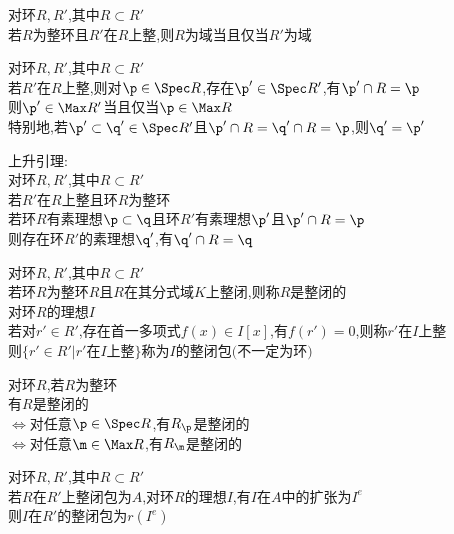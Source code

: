 \begin{dingli}
对环$R,R'$,其中$R\subset R'$\\
若$R$为整环且$R'$在$R$上整,则$R$为域当且仅当$R'$为域
\end{dingli}

\begin{dingli}
对环$R,R'$,其中$R\subset R'$\\
若$R'$在$R$上整,则对$\p\in \Spec R$,存在$\p'\in \Spec R'$,有$\p'\cap R=\p$\\
则$\p'\in\Max R'$当且仅当$\p\in \Max R$\\
特别地,若$\p'\subset\q'\in\Spec R'$且$\p'\cap R=\q'\cap R=\p$,则$\q'=\p'$
\end{dingli}

\begin{dingli}
上升引理:\\
对环$R,R'$,其中$R\subset R'$\\
若$R'$在$R$上整且环$R$为整环\\
若环$R$有素理想$ \p\subset\q$且环$R'$有素理想$\p'$且$\p'\cap R=\p$\\
则存在环$R'$的素理想$\q'$,有$\q'\cap R=\q$
\end{dingli}

\begin{dingyi}
对环$R,R'$,其中$R\subset R'$\\
若环$R$为整环$R$且$R$在其分式域$K$上整闭,则称$R$是整闭的\\
对环$R$的理想$I$\\
若对$r'\in R'$,存在首一多项式$f(x)\in I[x]$,有$f(r')=0$,则称$r'$在$I$上整\\
则$\{r'\in R'|r'\text{在}I\text{上整}\}$称为$I$的整闭包$($不一定为环$)$
\end{dingyi}

\begin{dingli}
对环$R$,若$R$为整环\\
有$R$是整闭的\\
$\Leftrightarrow$对任意$\p\in \Spec R$,有$R_{\p}$是整闭的\\
$\Leftrightarrow$对任意$\m\in \Max R$,有$R_{\m}$是整闭的
\end{dingli}

\begin{dingli}
对环$R,R'$,其中$R\subset R'$\\
若$R$在$R'$上整闭包为$A$,对环$R$的理想$I$,有$I$在$A$中的扩张为$I^{e}$\\
则$I$在$R'$的整闭包为$r(I^{e})$
\end{dingli}

